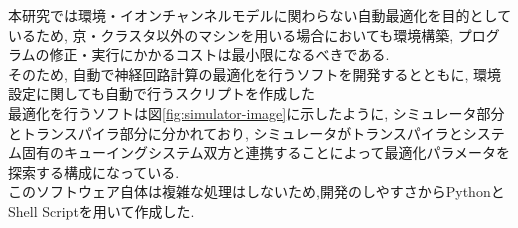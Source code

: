 本研究では環境・イオンチャンネルモデルに関わらない自動最適化を目的としているため,
京・クラスタ以外のマシンを用いる場合においても環境構築, プログラムの修正・実行にかかるコストは最小限になるべきである.\\
そのため, 自動で神経回路計算の最適化を行うソフトを開発するとともに, 環境設定に関しても自動で行うスクリプトを作成した\\
最適化を行うソフトは図\ref{fig:simulator-image}に示したように, シミュレータ部分とトランスパイラ部分に分かれており,
シミュレータがトランスパイラとシステム固有のキューイングシステム双方と連携することによって最適化パラメータを探索する構成になっている.\\
このソフトウェア自体は複雑な処理はしないため,開発のしやすさからPythonとShell Scriptを用いて作成した.\\






